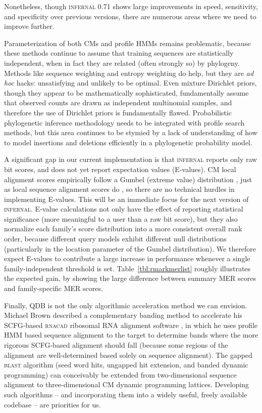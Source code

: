 \documentclass[11pt]{article}
\begin{document}
Nonetheless, though \textsc{infernal} 0.71 shows large improvements in
speed, sensitivity, and specificity over previous versions, there are
numerous areas where we need to improve further. 

Parameterization of both CMs and profile HMMs remains problematic,
because these methods continue to assume that training sequences are
statistically independent, when in fact they are related (often
strongly so) by phylogeny. Methods like sequence weighting and entropy
weighting do help, but they are \emph{ad hoc} hacks: unsatisfying and
unlikely to be optimal. Even mixture Dirichlet priors, though they
appear to be mathematically sophisticated, fundamentally assume that
observed counts are drawn as independent multinomial samples, and
therefore the use of Dirichlet priors is fundamentally flawed.
Probabilistic phylogenetic inference methodology needs to be
integrated with profile search methods, but this area continues to be
stymied by a lack of understanding of how to model insertions and
deletions efficiently in a phylogenetic probability model.

A significant gap in our current implementation is that
\textsc{infernal} reports only raw bit scores, and does not yet report
expectation values (E-values). CM local alignment scores empirically
follow a Gumbel (extreme value) distribution \cite{KleinEddy03}, just
as local sequence alignment scores do \cite{KarlinAltschul93}, so
there are no technical hurdles in implementing E-values. This will be
an immediate focus for the next version of \textsc{infernal}.  E-value
calculations not only have the effect of reporting statistical
significance (more meaningful to a user than a raw bit score), but
they also normalize each family's score distribution into a more
consistent overall rank order, because different query models exhibit
different null distributions (particularly in the location parameter
of the Gumbel distribution). We therefore expect E-values to
contribute a large increase in performance whenever a single
family-independent threshold is set. Table~\ref{tbl:rmarkmerlist}
roughly illustrates the expected gain, by showing the large difference
between summary MER scores and family-specific MER scores.

Finally, QDB is not the only algorithmic acceleration method we can
envision.  Michael Brown described a complementary banding method to
accelerate his SCFG-based \textsc{rnacad} ribosomal RNA alignment
software \cite{Brown00}, in which he uses profile HMM based sequence
alignment to the target to determine bands where the more rigorous
SCFG-based alignment should fall (because some regions of the
alignment are well-determined based solely on sequence alignment). The
gapped \textsc{blast} algorithm (seed word hits, ungapped hit extension, and
banded dynamic programming) can conceivably be extended from
two-dimensional sequence alignment to three-dimensional CM dynamic
programming lattices. Developing such algorithms -- and incorporating
them into a widely useful, freely available codebase -- are priorities
for us.
\end{document}
